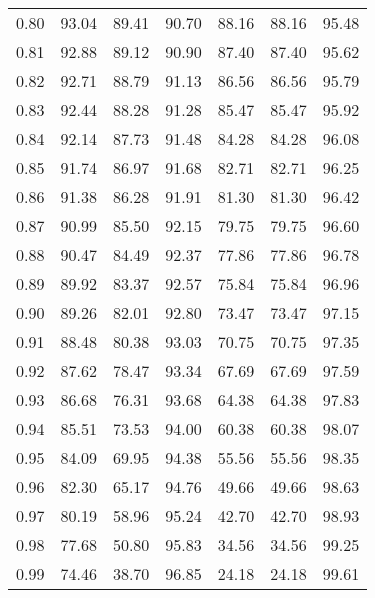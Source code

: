\begin{tabular}{|c|c|c|c|c|c|c|}
      0.80 &     93.04 &     89.41 &      90.70 &   88.16 &      88.16 &         95.48 \\
      0.81 &     92.88 &     89.12 &      90.90 &   87.40 &      87.40 &         95.62 \\
      0.82 &     92.71 &     88.79 &      91.13 &   86.56 &      86.56 &         95.79 \\
      0.83 &     92.44 &     88.28 &      91.28 &   85.47 &      85.47 &         95.92 \\
      0.84 &     92.14 &     87.73 &      91.48 &   84.28 &      84.28 &         96.08 \\
      0.85 &     91.74 &     86.97 &      91.68 &   82.71 &      82.71 &         96.25 \\
      0.86 &     91.38 &     86.28 &      91.91 &   81.30 &      81.30 &         96.42 \\
      0.87 &     90.99 &     85.50 &      92.15 &   79.75 &      79.75 &         96.60 \\
      0.88 &     90.47 &     84.49 &      92.37 &   77.86 &      77.86 &         96.78 \\
      0.89 &     89.92 &     83.37 &      92.57 &   75.84 &      75.84 &         96.96 \\
      0.90 &     89.26 &     82.01 &      92.80 &   73.47 &      73.47 &         97.15 \\
      0.91 &     88.48 &     80.38 &      93.03 &   70.75 &      70.75 &         97.35 \\
      0.92 &     87.62 &     78.47 &      93.34 &   67.69 &      67.69 &         97.59 \\
      0.93 &     86.68 &     76.31 &      93.68 &   64.38 &      64.38 &         97.83 \\
      0.94 &     85.51 &     73.53 &      94.00 &   60.38 &      60.38 &         98.07 \\
      0.95 &     84.09 &     69.95 &      94.38 &   55.56 &      55.56 &         98.35 \\
      0.96 &     82.30 &     65.17 &      94.76 &   49.66 &      49.66 &         98.63 \\
      0.97 &     80.19 &     58.96 &      95.24 &   42.70 &      42.70 &         98.93 \\
      0.98 &     77.68 &     50.80 &      95.83 &   34.56 &      34.56 &         99.25 \\
      0.99 &     74.46 &     38.70 &      96.85 &   24.18 &      24.18 &         99.61 \\
\bottomrule
\end{tabular}
